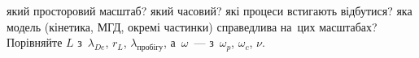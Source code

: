 \noindent{} який просторовий масштаб? який часовий? які процеси встигають
відбутися? яка модель (кінетика, МГД, окремі частинки) справедлива на~цих масштабах?
Порівняйте $L$ з~$\lambda_{De}$, $r_L$, $\lambda_{\text{пробігу}}$, а~$\omega$~--- з~$\omega_{p}$, $\omega_{c}$, $\nu$.
\clearpage
